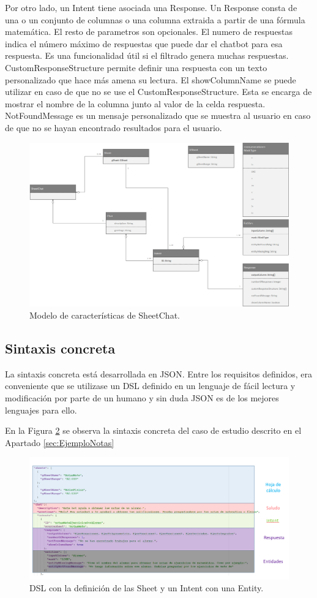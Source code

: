 Por otro lado, un Intent tiene asociada una Response. Un Response consta de una o un conjunto de columnas o una columna extraida a partir de una fórmula matemática. El resto de parametros son opcionales. El numero de respuestas indica el número máximo de respuestas que puede dar el chatbot para esa respuesta. Es una funcionalidad útil si el filtrado genera muchas respuestas. CustomResponseStructure permite definir una respuesta con un texto personalizado que hace más amena su lectura. El showColumnName se puede utilizar en caso de que no se use el CustomResponseStructure. Esta se encarga de mostrar el nombre de la columna junto al valor de la celda respuesta. NotFoundMessage es un mensaje personalizado que se muestra al usuario en caso de que no se hayan encontrado resultados para el usuario.

\begin{figure}[htb]
	\centering
	\includegraphics[width=1.1\textwidth]{./figs/Metamodel.png}
	\caption{Modelo de características de SheetChat.}
	\label{fig:Metamodel}
\end{figure}

\subsection{Sintaxis concreta}
\label{sec:ConcreteSyntax}

La sintaxis concreta está desarrollada en JSON. Entre los requisitos definidos, era conveniente que se utilizase un DSL definido en un lenguaje de fácil lectura y modificación por parte de un humano y sin duda JSON es de los mejores lenguajes para ello.

En la Figura \ref{fig:ConcreteSyntax} se observa la sintaxis concreta del caso de estudio descrito en el Apartado \ref{sec:EjemploNotas}

\begin{figure}[htb]
	\centering
	\includegraphics[width=1.2\textwidth]{./figs/DSLNotas.png}
	\caption{DSL con la definición de las Sheet y un Intent con una Entity.}
	\label{fig:ConcreteSyntax}
\end{figure}
